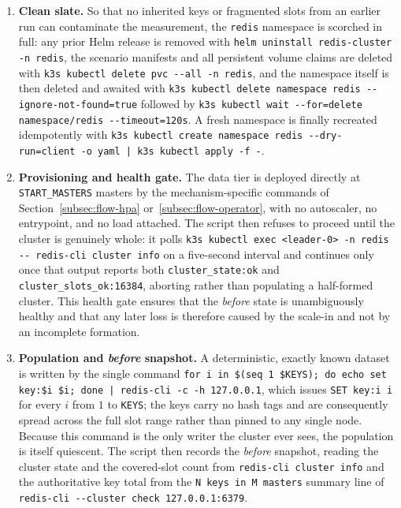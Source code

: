 \begin{enumerate}
  \item \textbf{Clean slate.} So that no inherited keys or fragmented slots from an earlier
  run can contaminate the measurement, the \texttt{redis} namespace is scorched in full: any
  prior Helm release is removed with \texttt{helm uninstall redis-cluster -n redis}, the
  scenario manifests and all persistent volume claims are deleted with
  \texttt{k3s kubectl delete pvc -{}-all -n redis}, and the namespace itself is then deleted
  and awaited with \texttt{k3s kubectl delete namespace redis -{}-ignore-not-found=true}
  followed by \texttt{k3s kubectl wait -{}-for=delete namespace/redis -{}-timeout=120s}.
  A fresh namespace is finally recreated idempotently with
  \texttt{k3s kubectl create namespace redis -{}-dry-run=client -o yaml | k3s kubectl apply -f -}.

  \item \textbf{Provisioning and health gate.} The data tier is deployed directly at
  \texttt{START\_MASTERS} masters by the mechanism-specific commands of
  Section~\ref{subsec:flow-hpa} or~\ref{subsec:flow-operator}, with no autoscaler, no
  entrypoint, and no load attached. The script then refuses to proceed until the cluster is
  genuinely whole: it polls \texttt{k3s kubectl exec <leader-0> -n redis -{}- redis-cli cluster info}
  on a five-second interval and continues only once that output reports both
  \texttt{cluster\_state:ok} and \texttt{cluster\_slots\_ok:16384}, aborting rather than
  populating a half-formed cluster. This health gate ensures that the \emph{before} state is
  unambiguously healthy and that any later loss is therefore caused by the scale-in and not
  by an incomplete formation.

  \item \textbf{Population and \emph{before} snapshot.} A deterministic, exactly known
  dataset is written by the single command
  \texttt{for i in \$(seq 1 \$KEYS); do echo set key:\$i \$i; done | redis-cli -c -h 127.0.0.1},
  which issues \texttt{SET key:i i} for every $i$ from $1$ to \texttt{KEYS}; the keys carry no
  hash tags and are consequently spread across the full slot range rather than pinned to any
  single node. Because this command is the only writer the cluster ever sees, the population
  is itself quiescent. The script then records the \emph{before} snapshot, reading the cluster
  state and the covered-slot count from \texttt{redis-cli cluster info} and the authoritative
  key total from the \texttt{N keys in M masters} summary line of
  \texttt{redis-cli -{}-cluster check 127.0.0.1:6379}.


\end{enumerate}
